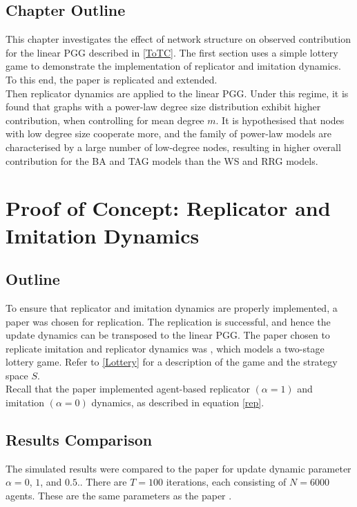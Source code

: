 \subsection{Chapter Outline}
This chapter investigates the effect of network structure on observed contribution for the linear PGG described in \ref{ToTC}. The first section uses a simple lottery game to demonstrate the implementation of replicator and imitation dynamics. To this end, the paper \cite{RN30} is replicated and extended. \\

Then replicator dynamics are applied to the linear PGG. Under this regime, it is found that graphs with a power-law degree size distribution exhibit higher contribution, when controlling for mean degree $m$. It is hypothesised that nodes with low degree size cooperate more, and the family of power-law models are characterised by a large number of low-degree nodes, resulting in higher overall contribution for the BA and TAG models than the WS and RRG models. 
\section{Proof of Concept: Replicator and Imitation Dynamics} \label{Lottery_Me}
\subsection{Outline}
To ensure that replicator and imitation dynamics are properly implemented, a paper was chosen for replication. The replication is successful, and hence the update dynamics can be transposed to the linear PGG. The paper chosen to replicate imitation and replicator dynamics was \cite{RN30}, which models a two-stage lottery game. Refer to \ref{Lottery} for a description of the game and the strategy space $S$. \\

Recall that the paper implemented agent-based replicator $(\alpha = 1)$ and imitation $(\alpha = 0)$ dynamics, as described in equation \eqref{rep}.

\subsection{Results Comparison}
The simulated results were compared to the paper for update dynamic parameter $\alpha = 0$, $1$, and $0.5$.. There are $T=100$ iterations, each consisting of $N=6000$ agents. These are the same parameters as the paper \cite{RN30}.

